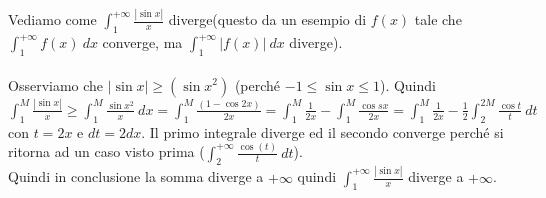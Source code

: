 \begin{example}
Vediamo come $\int_1^{+\infty}\frac{|\sin{x}|}{x}$ diverge(questo da un esempio di $f(x)$ tale che $\int_1^{+\infty}f(x)\:dx$ converge, ma $\int_1^{+\infty}|f(x)|\:dx$ diverge).\\\\
Osserviamo che $|\sin{x}| \geq (\sin{x}^2)$ (perché $-1 \leq \sin{x} \leq 1$). Quindi $\int_1^{M}\frac{|\sin{x}|}{x} \geq \int_1^{M}\frac{\sin{x}^2}{x}\:dx = \int_1^{M}\frac{(1-\cos{2x})}{2x} = \int_1^{M}\frac{1}{2x} - \int_1^{M}\frac{\cos{sx}}{2x} = \int_1^{M}\frac{1}{2x} - \frac{1}{2}\int_2^{2M}\frac{\cos{t}}{t}\:dt$ con $t=2x$ e $dt=2dx$. Il primo integrale diverge ed il secondo converge perché si ritorna ad un caso visto prima ($\int_2^{+\infty}\frac{\cos(t)}{t}\:dt$). \\
Quindi in conclusione la somma diverge a $+\infty$ quindi $\int_1^{+\infty}\frac{|\sin{x}|}{x}$ diverge a $+\infty$.
\end{example}

